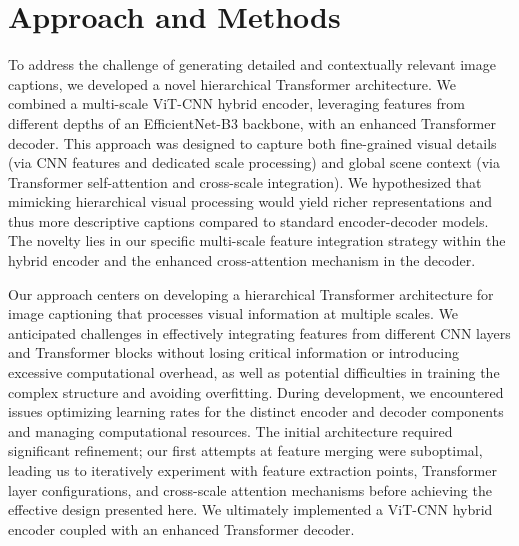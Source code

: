 \documentclass[10pt,twocolumn,letterpaper]{article}
\begin{document}
\section{Approach and Methods}

To address the challenge of generating detailed and contextually relevant image captions, we developed a novel hierarchical Transformer architecture. We combined a multi-scale ViT-CNN hybrid encoder, leveraging features from different depths of an EfficientNet-B3 backbone, with an enhanced Transformer decoder. This approach was designed to capture both fine-grained visual details (via CNN features and dedicated scale processing) and global scene context (via Transformer self-attention and cross-scale integration). We hypothesized that mimicking hierarchical visual processing would yield richer representations and thus more descriptive captions compared to standard encoder-decoder models. The novelty lies in our specific multi-scale feature integration strategy within the hybrid encoder and the enhanced cross-attention mechanism in the decoder.

Our approach centers on developing a hierarchical Transformer architecture for image captioning that processes visual information at multiple scales. We anticipated challenges in effectively integrating features from different CNN layers and Transformer blocks without losing critical information or introducing excessive computational overhead, as well as potential difficulties in training the complex structure and avoiding overfitting. During development, we encountered issues optimizing learning rates for the distinct encoder and decoder components and managing computational resources. The initial architecture required significant refinement; our first attempts at feature merging were suboptimal, leading us to iteratively experiment with feature extraction points, Transformer layer configurations, and cross-scale attention mechanisms before achieving the effective design presented here. We ultimately implemented a ViT-CNN hybrid encoder coupled with an enhanced Transformer decoder.
\end{document}
